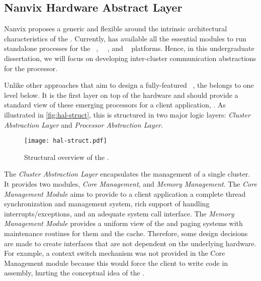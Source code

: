 	\subsection{Nanvix Hardware Abstract Layer}
	\label{sec.hal}


		Nanvix \os proposes a generic and flexible \hal around the
		intrinsic architectural characteristics of the \lightweight \manycores.
		Currently, \hal has available all the essential modules to run standalone
		processes for the \mppa~\cite{DeDinechin2013-1}, \optimsoc~~\cite{Wallentowitz2013},
		and \hero~\cite{Kurth2017} platforms.
		Hence, in this undergraduate dissertation, we will focus on developing
		inter-cluster communication abstractions for the \mppa processor.

		Unlike other approaches that aim to design a fully-featured \os~\cite{Baumann2009,kluge2014,nightingale2009,rhoden2011},
		the \hal belongs to one level below.
		It is the first layer on top of the hardware and should provide a standard
		view of these emerging processors for a client application, \eg \os.
		As illustrated in \autoref{fig:hal-struct}, this \hal is structured in
		two major logic layers: \textit{Cluster Abstraction Layer} and \textit{Processor Abstraction Layer}.

		\begin{figure}[t]
			\centering%
			\caption{Structural overview of the \hal.}%
			\label{fig:hal-struct}%
			\texttt{[image: hal-struct.pdf]}%
		\end{figure}

		The \textit{Cluster Abstraction Layer} encapsulates the management of a single cluster.
		It provides two modules, \textit{Core Management}, and \textit{Memory Management}.
		The \textit{Core Management Module} aims to provide to a client application a complete
		thread synchronization and management system, rich support of handling
		interrupts/exceptions, and an adequate system call interface.
		The \textit{Memory Management Module} provides a uniform view of the \tlbs
		and paging systems with maintenance routines for them and the cache.
		Therefore, some design decisions are made to create interfaces that are not
		dependent on the underlying hardware.
		For example, a context switch mechanism was not provided in the
		Core Management module because this would force the client \os
		to write code in assembly, hurting the conceptual idea of the \hal.

